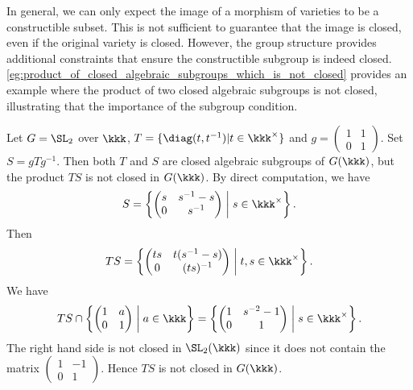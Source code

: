     \begin{remark}\label{rmk:subgroup_and_constructible_subset}
        In general, we can only expect the image of a morphism of varieties to be a constructible subset.
        This is not sufficient to guarantee that the image is closed, even if the original variety is closed.
        However, the group structure provides additional constraints that ensure the constructible subgroup is indeed closed.
        \cref{eg:product_of_closed_algebraic_subgroups_which_is_not_closed} provides an example where the product of two closed algebraic subgroups is not closed, illustrating that the importance of the subgroup condition.

    \end{remark}

    \begin{example}\label{eg:product_of_closed_algebraic_subgroups_which_is_not_closed}
        Let \(G = \SL_2\) over \(\kkk\), \(T = \{\diag(t,t^{-1})|t \in \kkk^\times\}\) and \(g = \begin{pmatrix}
            1 & 1 \\
            0 & 1
        \end{pmatrix}\).
        Set \(S = gTg^{-1}\).
        Then both \(T\) and \(S\) are closed algebraic subgroups of \(G(\kkk)\), but the product \(TS\) is not closed in \(G(\kkk)\).
        By direct computation, we have
        \[ S = \left\{ \begin{pmatrix}
            s & s^{-1}-s \\
            0 & s^{-1}
        \end{pmatrix} \;\middle|\; s \in \kkk^\times \right\}.
        \]
        Then 
        \[ TS = \left\{ \begin{pmatrix}
            ts & t(s^{-1}-s) \\
            0 & (ts)^{-1}
        \end{pmatrix} \;\middle|\; t,s \in \kkk^\times \right\}.
        \]
        We have 
        \[ TS \cap \left\{ \begin{pmatrix}
            1 & a \\
            0 & 1
        \end{pmatrix} \;\middle|\; a \in \kkk \right\} = \left\{ \begin{pmatrix}
            1 & s^{-2}-1 \\
            0 & 1
        \end{pmatrix} \;\middle|\; s \in \kkk^\times \right\}. \]
        The right hand side is not closed in \(\SL_2(\kkk)\) since it does not contain the matrix \(\begin{pmatrix}
            1 & -1 \\
            0 & 1
        \end{pmatrix}\).
        Hence \(TS\) is not closed in \(G(\kkk)\).
    \end{example}

